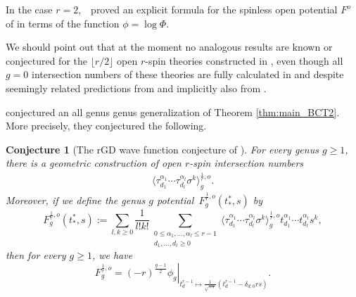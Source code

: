 \documentclass[11pt]{amsart}
\newtheorem{conj}{Conjecture}
\theoremstyle{definition}
\theoremstyle{remark}
\renewcommand{\d}{\ensuremath{\partial}}
\newcommand{\<}{\left<}
\renewcommand{\>}{\right>}
\numberwithin{equation}{section}
\begin{document}
In the case $r=2,$~\cite{Bur16} proved  an explicit formula for the spinless open potential %
$F^o$ of \cite{PST14,Tes15} in terms of the function $\phi=\log\Phi$. 


We should point out that at the moment no analogous results are known or conjectured for the $\lfloor r/2\rfloor$ open $r$-spin theories constructed in \cite{TZ1,TZ2}, even though all $g=0$ intersection numbers of these theories are fully %
calculated in \cite{TZ2} and despite seemingly related predictions from \cite{Horiprivate} and implicitly also %
from \cite{Hori}.

\cite{BCT3} conjectured an  all genus genus generalization of Theorem \ref{thm:main_BCT2}. More precisely, they conjectured the following. 
\begin{conj}[The rGD wave function conjecture of \cite{BCT3}]\label{conj:main_conj_BCT}
For every genus $g\geq 1$, there is a geometric construction of open $r$-spin intersection numbers
\begin{gather}\label{eq:open_numbers_all_g}
\langle\tau^{\alpha_1}_{d_1}\cdots\tau^{\alpha_l}_{d_l}\sigma^k\rangle^{\frac{1}{r},o}_g.
\end{gather}
Moreover, if we define the genus $g$ potential~$F_g^{\frac{1}{r},o}(t^*_*,s)$ %
by
\begin{equation}\label{eq:g_pot}
F_g^{\frac{1}{r},o}(t^*_*,s):=\sum_{l,k\ge 0}\frac{1}{l!k!}\sum_{\substack{0\le\alpha_1,\ldots,\alpha_l\le r-1\\d_1,\ldots,d_l\ge 0}}\langle\tau^{\alpha_1}_{d_1}\cdots\tau^{\alpha_l}_{d_l}\sigma^k\rangle^{\frac{1}{r},o}_g t^{\alpha_1}_{d_1}\cdots t^{\alpha_l}_{d_l}s^k,
\end{equation}
then for %
every $g\geq 1$, we have
\begin{equation}\label{eq:bct_conj}
F^{\frac{1}{r},o}_g=\left.(-r)^{\frac{g-1}{2}}\phi_g\right|_{t^{r-1}_d\mapsto\frac{1}{\sqrt{-r}}(t^{r-1}_d-\delta_{d,0}rs)}.
\end{equation}
\end{conj}
\end{document}
